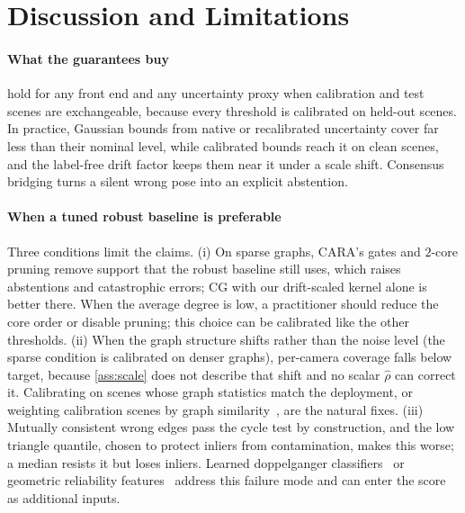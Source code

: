 \section{Discussion and Limitations}\label{sec:discussion}

\paragraph*{What the guarantees buy}  hold for any front end and any uncertainty proxy when calibration and test scenes are exchangeable, because every threshold is calibrated on held-out scenes. In practice, Gaussian bounds from native or recalibrated uncertainty cover far less than their nominal level, while calibrated bounds reach it on clean scenes, and the label-free drift factor keeps them near it under a scale shift. Consensus bridging turns a silent wrong pose into an explicit abstention.

\paragraph*{When a tuned robust baseline is preferable} Three conditions limit the claims. (i) On sparse graphs, CARA's gates and $2$-core pruning remove support that the robust baseline still uses, which raises abstentions and catastrophic errors; CG with our drift-scaled kernel alone is better there. When the average degree is low, a practitioner should reduce the core order or disable pruning; this choice can be calibrated like the other thresholds. (ii) When the graph structure shifts rather than the noise level (the sparse condition is calibrated on denser graphs), per-camera coverage falls below target, because \cref{ass:scale} does not describe that shift and no scalar $\hat\rho$ can correct it. Calibrating on scenes whose graph statistics match the deployment, or weighting calibration scenes by graph similarity~\cite{tibshirani2019covariate}, are the natural fixes. (iii) Mutually consistent wrong edges pass the cycle test by construction, and the low triangle quantile, chosen to protect inliers from contamination, makes this worse; a median resists it but loses inliers. Learned doppelganger classifiers~\cite{cai2023doppelgangers,xiangli2025doppelgangerspp} or geometric reliability features~\cite{ahmedt2026geocond} address this failure mode and can enter the score as additional inputs.

